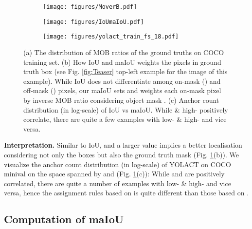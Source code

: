 \documentclass{bmvc2k}
\begin{document}
 \begin{figure}
        \captionsetup[subfigure]{}
        \centering
        \begin{subfigure}[b]{0.35\textwidth}
                \texttt{[image: figures/MoverB.pdf]}
                \caption{}
        \end{subfigure}       
        \begin{subfigure}[b]{0.3\textwidth}
                \texttt{[image: figures/IoUmaIoU.pdf]}
\caption{}
        \end{subfigure}
        \begin{subfigure}[b]{0.27\textwidth}
                \texttt{[image: figures/yolact\_train\_fs\_18.pdf]}
                \caption{}
        \end{subfigure}             
        \caption{(a) The distribution of MOB ratios of the ground truths on COCO training set. (b) How IoU and maIoU weights the pixels in ground truth box (see Fig. \ref{fig:Teaser} top-left example for the image of this example). While IoU does not differentiate among on-mask () and off-mask () pixels, our maIoU sets  and weights each on-mask pixel by inverse MOB ratio considering object mask . (c) Anchor count distribution (in log-scale) of IoU vs maIoU. While  \& high- positively correlate, there are quite a few examples with low- \& high- and vice versa.}
        \label{fig:MOB}
\end{figure}

\noindent \textbf{Interpretation.} Similar to IoU,  and a larger value implies a better localisation considering not only the boxes but also the ground truth mask (Fig. \ref{fig:MOB}(b)). We visualize the anchor count  distribution (in log-scale) of YOLACT on COCO minival on the space spanned by  and  (Fig. \ref{fig:MOB}(c)): While  and  are positively correlated, there are quite a number of examples with low- \& high- and vice versa, hence the assignment rules based on  is quite different than those based on .  





\subsection{Computation of maIoU}
\label{subsec:Algorithm}
\end{document}
